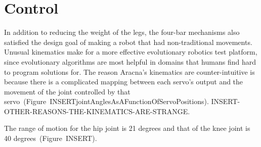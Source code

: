 \documentclass[letterpaper]{article}
\begin{document}



\begin{table}[h]
\vskip 0.25cm
\caption{Estimated total cost. The cost of components and printing material reflect market prices from March 2012. A complete parts list is on our website \citep{WEB}.}
\end{table}



\section{Control}

In addition to reducing the weight of the legs, the four-bar
mechanisms also satisfied the design goal of making a robot that had
non-traditional movements. Unusual kinematics make for a more effective evolutionary robotics test platform, since evolutionary algorithms are most helpful in domains that humans find hard to program solutions for. The reason Aracna's kinematics are counter-intuitive is because there is a complicated mapping between each servo's output and the movement of the joint controlled by that servo~(Figure~INSERTjointAnglesAsAFunctionOfServoPositions). INSERT-OTHER-REASONS-THE-KINEMATICS-ARE-STRANGE. 

The range of motion for the hip joint is 21 degrees and that of the knee joint is 40 degrees~(Figure~INSERT). 
\end{document}
